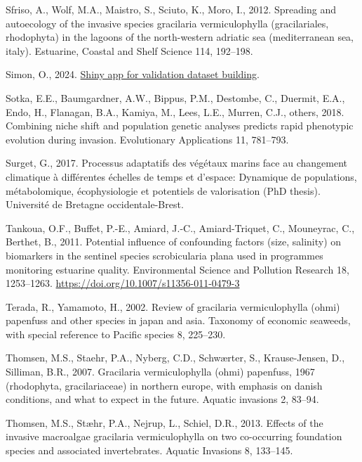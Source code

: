 \documentclass[
  letterpaper,
  DIV=11,
  numbers=noendperiod]{scrartcl}
\newlength{\cslhangindent}
\newenvironment{CSLReferences}[2] %
 {\begin{list}{}{%
  \setlength{\itemindent}{0pt}
  \setlength{\leftmargin}{0pt}
  \setlength{\parsep}{0pt}
  \ifodd #1
   \setlength{\leftmargin}{\cslhangindent}
   \setlength{\itemindent}{-1\cslhangindent}
  \fi
  \setlength{\itemsep}{#2\baselineskip}}}
 {\end{list}}
\begin{document}
\begin{CSLReferences}{1}{0}
Sfriso, A., Wolf, M.A., Maistro, S., Sciuto, K., Moro, I., 2012.
Spreading and autoecology of the invasive species gracilaria
vermiculophylla (gracilariales, rhodophyta) in the lagoons of the
north-western adriatic sea (mediterranean sea, italy). Estuarine,
Coastal and Shelf Science 114, 192--198.

Simon, O., 2024.
\href{https://oirysimon.shinyapps.io/shiny_validate/}{Shiny app for
validation dataset building}.

Sotka, E.E., Baumgardner, A.W., Bippus, P.M., Destombe, C., Duermit,
E.A., Endo, H., Flanagan, B.A., Kamiya, M., Lees, L.E., Murren, C.J.,
others, 2018. Combining niche shift and population genetic analyses
predicts rapid phenotypic evolution during invasion. Evolutionary
Applications 11, 781--793.

Surget, G., 2017. Processus adaptatifs des v{é}g{é}taux marins face au
changement climatique {à} diff{é}rentes {é}chelles de temps et d'espace:
Dynamique de populations, m{é}tabolomique, {é}cophysiologie et
potentiels de valorisation (PhD thesis). Universit{é} de Bretagne
occidentale-Brest.

Tankoua, O.F., Buffet, P.-E., Amiard, J.-C., Amiard-Triquet, C.,
Mouneyrac, C., Berthet, B., 2011. Potential influence of confounding
factors (size, salinity) on biomarkers in the sentinel species
scrobicularia plana used in programmes monitoring estuarine quality.
Environmental Science and Pollution Research 18, 1253--1263.
\url{https://doi.org/10.1007/s11356-011-0479-3}

Terada, R., Yamamoto, H., 2002. Review of gracilaria vermiculophylla
(ohmi) papenfuss and other species in japan and asia. Taxonomy of
economic seaweeds, with special reference to Pacific species 8,
225--230.

Thomsen, M.S., Staehr, P.A., Nyberg, C.D., Schwærter, S., Krause-Jensen,
D., Silliman, B.R., 2007. Gracilaria vermiculophylla (ohmi) papenfuss,
1967 (rhodophyta, gracilariaceae) in northern europe, with emphasis on
danish conditions, and what to expect in the future. Aquatic invasions
2, 83--94.

Thomsen, M.S., Stæhr, P.A., Nejrup, L., Schiel, D.R., 2013. Effects of
the invasive macroalgae gracilaria vermiculophylla on two co-occurring
foundation species and associated invertebrates. Aquatic Invasions 8,
133--145.


\end{CSLReferences}
\end{document}
